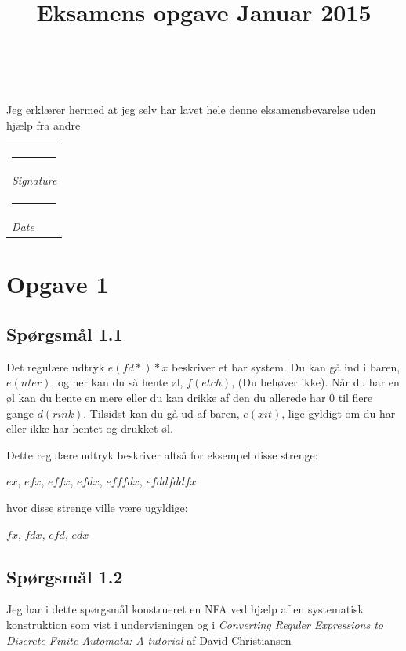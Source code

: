 \documentclass[danish,a4paper]{report}
\title{\Huge \textbf{\titlename}\\\huge Eksamens opgave Januar 2015}
\author{\textsc{\name} \\ \textsc{\email}}
\makeatletter
\newcommand{\namesigdate}[2][10cm]{%
  \begin{tabular}{@{}p{#1}@{}}
    #2 \\[2\normalbaselineskip] \hrule \\[0pt]
    {\small \textit{Signature}} \\[2\normalbaselineskip] \hrule \\[0pt]
    {\small \textit{Date}}
  \end{tabular}
}
\makeatother
\begin{document}
\maketitle

\vspace*{\fill}
\begin{center}
\begin{large}
Jeg erklærer hermed at jeg selv har lavet hele denne eksamensbevarelse uden hjælp fra andre
\end{large}

\vspace*{2cm}
\namesigdate{}
\end{center}

\vspace*{\fill}


\newpage

\chapter*{Opgave 1}
\section*{Spørgsmål 1.1}
Det regulære udtryk $e(fd*)*x$ beskriver et bar system. Du kan gå ind i baren, $e(nter)$, og her kan du så hente øl, $f(etch)$, (Du behøver ikke). Når du har en øl kan du hente en mere eller du kan drikke af den du allerede har 0 til flere gange $d(rink)$. Tilsidst kan du gå ud af baren, $e(xit)$, lige gyldigt om du har eller ikke har hentet og drukket øl.

Dette regulære udtryk beskriver altså for eksempel disse strenge:
\begin{center}$ ex$,
$efx$,
$effx$,
$efdx$,
$efffdx$,
$efddfddfx$
\end{center}
hvor disse strenge ville være ugyldige:
\begin{center}
$fx$,
$fdx$,
$efd$,
$edx$
\end{center}
\section*{Spørgsmål 1.2}
\label{sec:sp2}

Jeg har i dette spørgsmål konstrueret en NFA ved hjælp af en systematisk konstruktion som vist i undervisningen og i \textit{Converting Reguler Expressions to Discrete Finite Automata: A tutorial} af David Christiansen\\
\end{document}
